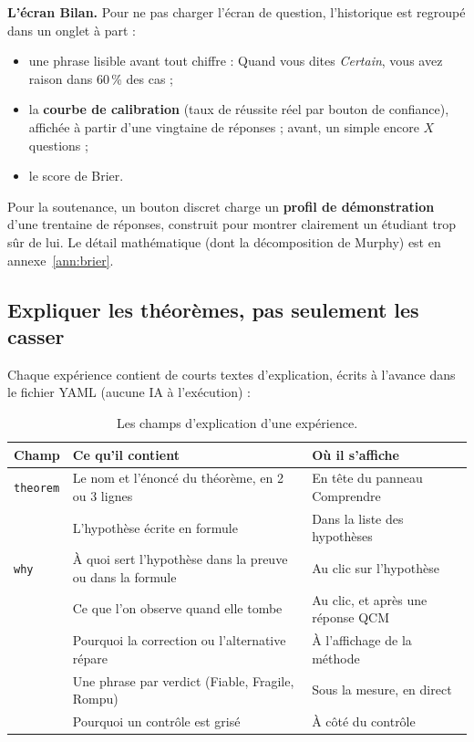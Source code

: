 \documentclass[11pt,a4paper]{article}
\begin{document}
\textbf{L'écran Bilan.} Pour ne pas charger l'écran de question, l'historique est regroupé dans un onglet à part :
\begin{itemize}[leftmargin=*, nosep]
  \item une phrase lisible avant tout chiffre : \og Quand vous dites \emph{Certain}, vous avez raison dans 60\,\% des cas \fg{} ;
  \item la \textbf{courbe de calibration} (taux de réussite réel par bouton de confiance), affichée à partir d'une vingtaine de réponses ; avant, un simple \og encore $X$ questions \fg{} ;
  \item le score de Brier.
\end{itemize}
Pour la soutenance, un bouton discret charge un \textbf{profil de démonstration} d'une trentaine de réponses, construit pour montrer clairement un étudiant trop sûr de lui. Le détail mathématique (dont la décomposition de Murphy) est en annexe~\ref{ann:brier}.

\subsection{Expliquer les théorèmes, pas seulement les casser}\label{sec:explications}
Chaque expérience contient de courts textes d'explication, écrits à l'avance dans le fichier YAML (aucune IA à l'exécution) :

\begin{table}[H]
  \centering
  \small
  \begin{tabularx}{\textwidth}{@{}L{3.6cm} Y L{4.6cm}@{}}
    \toprule
    \textbf{Champ} & \textbf{Ce qu'il contient} & \textbf{Où il s'affiche} \\
    \midrule
    \texttt{theorem} & Le nom et l'énoncé du théorème, en 2 ou 3 lignes & En tête du panneau Comprendre \\
     & L'hypothèse écrite en formule & Dans la liste des hypothèses \\
    \texttt{why} & À quoi sert l'hypothèse dans la preuve ou dans la formule & Au clic sur l'hypothèse \\
     & Ce que l'on observe quand elle tombe & Au clic, et après une réponse QCM \\
     & Pourquoi la correction ou l'alternative répare & À l'affichage de la méthode \\
     & Une phrase par verdict (Fiable, Fragile, Rompu) & Sous la mesure, en direct \\
     & Pourquoi un contrôle est grisé & À côté du contrôle \\
    \bottomrule
  \end{tabularx}
  \caption{Les champs d'explication d'une expérience.}
\end{table}
\end{document}
